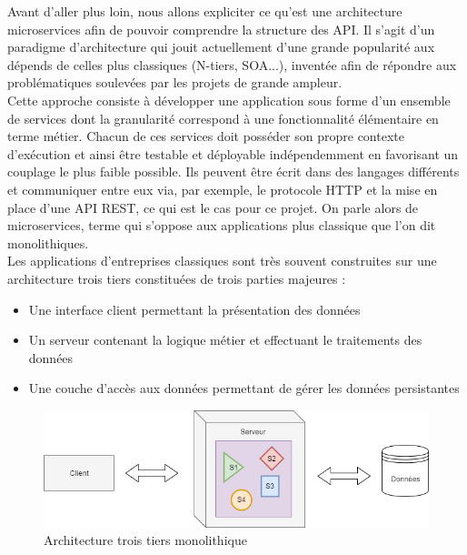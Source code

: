 	Avant d'aller plus loin, nous allons expliciter ce qu'est une architecture microservices \cite{bib_microservices} afin de pouvoir comprendre la structure des API. Il s'agit d'un paradigme d'architecture qui jouit actuellement d'une grande popularité aux dépends de celles plus classiques (N-tiers, SOA...), inventée afin de répondre aux problématiques soulevées par les projets de grande ampleur. \\
	
	Cette approche consiste à développer une application sous forme d'un ensemble de services dont la granularité correspond à une fonctionnalité élémentaire en terme métier. Chacun de ces services doit posséder son propre contexte d'exécution et ainsi être testable et déployable indépendemment en favorisant un couplage le plus faible possible. Ils peuvent être écrit dans des langages différents et communiquer entre eux via, par exemple, le protocole HTTP et la mise en place d'une API REST, ce qui est le cas pour ce projet. On parle alors de microservices, terme qui s'oppose aux applications plus classique que l'on dit monolithiques.\\
	
	Les applications d'entreprises classiques sont très souvent construites sur une architecture trois tiers constituées de trois parties majeures :
	\begin{itemize}
		\item Une interface client permettant la présentation des données
		\item Un serveur contenant la logique métier et effectuant le traitements des données
		\item Une couche d'accès aux données permettant de gérer les données persistantes \\
	\end{itemize}
	
\begin{figure}[h!]
	\includegraphics[scale=0.5]{images/travailNeuflizeOBC/architecture/troisTiers.png}
	\centering
	\caption{Architecture trois tiers monolithique}
	\label{troisTiers}
\end{figure}
	
